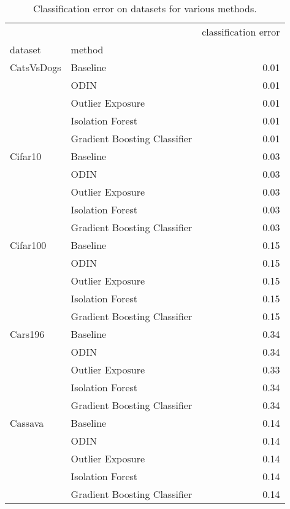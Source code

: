 \documentclass{article}
\begin{document}
\begin{table}
\centering
\caption{Classification error on datasets for various methods.}
\label{aggCLFResult}
\begin{tabular}{llr}
\toprule
        &                              &  classification error \\
dataset & method &                       \\
\midrule
CatsVsDogs & Baseline &                  0.01 \\
        & ODIN &                  0.01 \\
        & Outlier Exposure &                  0.01 \\
        & Isolation Forest &                  0.01 \\
        & Gradient Boosting Classifier &                  0.01 \\
Cifar10 & Baseline &                  0.03 \\
        & ODIN &                  0.03 \\
        & Outlier Exposure &                  0.03 \\
        & Isolation Forest &                  0.03 \\
        & Gradient Boosting Classifier &                  0.03 \\
Cifar100 & Baseline &                  0.15 \\
        & ODIN &                  0.15 \\
        & Outlier Exposure &                  0.15 \\
        & Isolation Forest &                  0.15 \\
        & Gradient Boosting Classifier &                  0.15 \\
Cars196 & Baseline &                  0.34 \\
        & ODIN &                  0.34 \\
        & Outlier Exposure &                  0.33 \\
        & Isolation Forest &                  0.34 \\
        & Gradient Boosting Classifier &                  0.34 \\
Cassava & Baseline &                  0.14 \\
        & ODIN &                  0.14 \\
        & Outlier Exposure &                  0.14 \\
        & Isolation Forest &                  0.14 \\
        & Gradient Boosting Classifier &                  0.14 \\
\bottomrule
\end{tabular}
\end{table}
 
\end{document}
